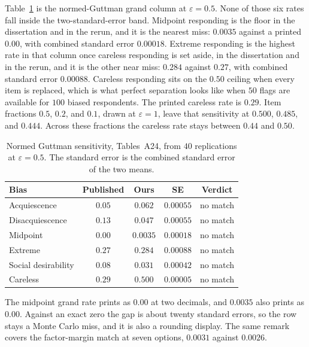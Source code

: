 \documentclass[11pt]{article}
\begin{document}
Table~\ref{tab:guttman} is the normed-Guttman grand column at
\(\varepsilon=0.5\).
None of those six rates fall inside the two-standard-error band.
Midpoint responding is the floor in the dissertation and in the rerun,
and it is the nearest miss: \(0.0035\) against a printed \(0.00\), with
combined standard error \(0.00018\).
Extreme responding is the highest rate in that column once careless
responding is set aside, in the dissertation and in the rerun, and it
is the other near miss: \(0.284\) against \(0.27\), with combined
standard error \(0.00088\).
Careless responding sits on the \(0.50\) ceiling when every item is
replaced, which is what perfect separation looks like when \(50\) flags
are available for \(100\) biased respondents.
The printed careless rate is \(0.29\).
Item fractions \(0.5\), \(0.2\), and \(0.1\), drawn at \(\varepsilon=1\),
leave that sensitivity at \(0.500\), \(0.485\), and \(0.444\).
Across these fractions the careless rate stays between \(0.44\) and
\(0.50\).

\begin{table}[ht]
\centering
\begin{tabular}{@{}lcccc@{}}
\toprule
Bias & Published & Ours & SE & Verdict \\
\midrule
Acquiescence & \(0.05\) & \(0.062\) & \(0.00055\) & no match \\
Disacquiescence & \(0.13\) & \(0.047\) & \(0.00055\) & no match \\
Midpoint & \(0.00\) & \(0.0035\) & \(0.00018\) & no match \\
Extreme & \(0.27\) & \(0.284\) & \(0.00088\) & no match \\
Social desirability & \(0.08\) & \(0.031\) & \(0.00042\) & no match \\
Careless & \(0.29\) & \(0.500\) & \(0.00005\) & no match \\
\bottomrule
\end{tabular}
\caption{Normed Guttman sensitivity, Tables~A24, from \(40\)
replications at \(\varepsilon=0.5\). The standard error is the combined
standard error of the two means.}
\label{tab:guttman}
\end{table}

The midpoint grand rate prints as \(0.00\) at two decimals, and \(0.0035\)
also prints as \(0.00\).
Against an exact zero the gap is about twenty standard errors, so the
row stays a Monte Carlo miss, and it is also a rounding display.
The same remark covers the factor-margin match at seven options,
\(0.0031\) against \(0.0026\).
\end{document}
